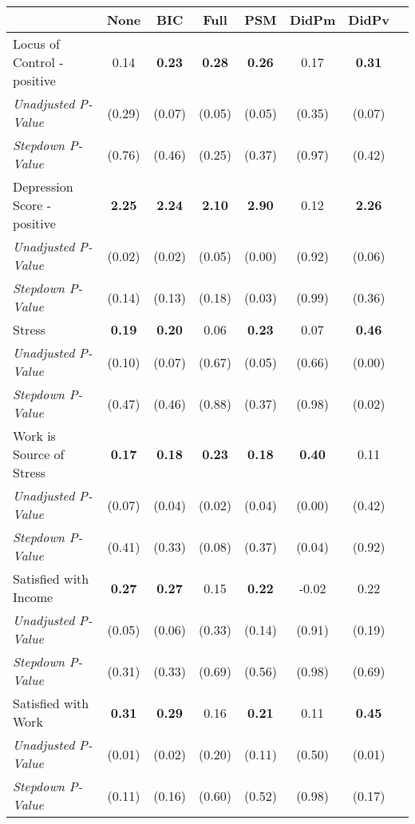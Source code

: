 \begin{tabular}{l c c c c c c c}
\toprule
 & None & BIC & Full & PSM & DidPm & DidPv \\
\midrule
Locus of Control - positive & 0.14 & \textbf{ 0.23 } & \textbf{ 0.28 } & \textbf{ 0.26 } & 0.17 & \textbf{ 0.31 } \\
\quad \textit{Unadjusted P-Value} & (0.29) & (0.07) & (0.05) & (0.05) & (0.35) & (0.07) \\
\quad \textit{Stepdown P-Value} & (0.76) & (0.46) & (0.25) & (0.37) & (0.97) & (0.42) \\
Depression Score - positive & \textbf{ 2.25 } & \textbf{ 2.24 } & \textbf{ 2.10 } & \textbf{ 2.90 } & 0.12 & \textbf{ 2.26 } \\
\quad \textit{Unadjusted P-Value} & (0.02) & (0.02) & (0.05) & (0.00) & (0.92) & (0.06) \\
\quad \textit{Stepdown P-Value} & (0.14) & (0.13) & (0.18) & (0.03) & (0.99) & (0.36) \\
Stress & \textbf{ 0.19 } & \textbf{ 0.20 } & 0.06 & \textbf{ 0.23 } & 0.07 & \textbf{ 0.46 } \\
\quad \textit{Unadjusted P-Value} & (0.10) & (0.07) & (0.67) & (0.05) & (0.66) & (0.00) \\
\quad \textit{Stepdown P-Value} & (0.47) & (0.46) & (0.88) & (0.37) & (0.98) & (0.02) \\
Work is Source of Stress & \textbf{ 0.17 } & \textbf{ 0.18 } & \textbf{ 0.23 } & \textbf{ 0.18 } & \textbf{ 0.40 } & 0.11 \\
\quad \textit{Unadjusted P-Value} & (0.07) & (0.04) & (0.02) & (0.04) & (0.00) & (0.42) \\
\quad \textit{Stepdown P-Value} & (0.41) & (0.33) & (0.08) & (0.37) & (0.04) & (0.92) \\
Satisfied with Income & \textbf{ 0.27 } & \textbf{ 0.27 } & 0.15 & \textbf{ 0.22 } & -0.02 & 0.22 \\
\quad \textit{Unadjusted P-Value} & (0.05) & (0.06) & (0.33) & (0.14) & (0.91) & (0.19) \\
\quad \textit{Stepdown P-Value} & (0.31) & (0.33) & (0.69) & (0.56) & (0.98) & (0.69) \\
Satisfied with Work & \textbf{ 0.31 } & \textbf{ 0.29 } & 0.16 & \textbf{ 0.21 } & 0.11 & \textbf{ 0.45 } \\
\quad \textit{Unadjusted P-Value} & (0.01) & (0.02) & (0.20) & (0.11) & (0.50) & (0.01) \\
\quad \textit{Stepdown P-Value} & (0.11) & (0.16) & (0.60) & (0.52) & (0.98) & (0.17) \\

\end{tabular}
